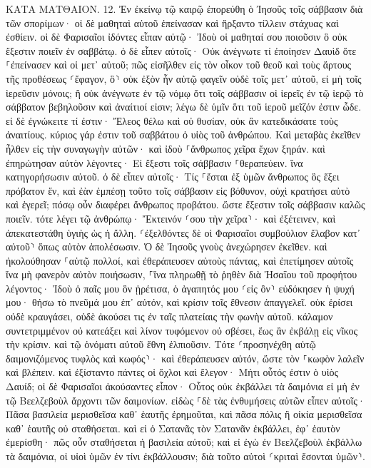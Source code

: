 \documentclass[twoside, 9pt]{extreport}
\begin{document}
ΚΑΤΑ ΜΑΤΘΑΙΟΝ.
12.
Ἐν ἐκείνῳ τῷ καιρῷ ἐπορεύθη ὁ Ἰησοῦς τοῖς σάββασιν διὰ τῶν σπορίμων· οἱ δὲ μαθηταὶ αὐτοῦ ἐπείνασαν καὶ ἤρξαντο τίλλειν στάχυας καὶ ἐσθίειν. 
οἱ δὲ Φαρισαῖοι ἰδόντες εἶπαν αὐτῷ· Ἰδοὺ οἱ μαθηταί σου ποιοῦσιν ὃ οὐκ ἔξεστιν ποιεῖν ἐν σαββάτῳ. 
ὁ δὲ εἶπεν αὐτοῖς· Οὐκ ἀνέγνωτε τί ἐποίησεν Δαυὶδ ὅτε ⸀ἐπείνασεν καὶ οἱ μετ᾽ αὐτοῦ; 
πῶς εἰσῆλθεν εἰς τὸν οἶκον τοῦ θεοῦ καὶ τοὺς ἄρτους τῆς προθέσεως ⸂ἔφαγον, ὃ⸃ οὐκ ἐξὸν ἦν αὐτῷ φαγεῖν οὐδὲ τοῖς μετ᾽ αὐτοῦ, εἰ μὴ τοῖς ἱερεῦσιν μόνοις; 
ἢ οὐκ ἀνέγνωτε ἐν τῷ νόμῳ ὅτι τοῖς σάββασιν οἱ ἱερεῖς ἐν τῷ ἱερῷ τὸ σάββατον βεβηλοῦσιν καὶ ἀναίτιοί εἰσιν; 
λέγω δὲ ὑμῖν ὅτι τοῦ ἱεροῦ μεῖζόν ἐστιν ὧδε. 
εἰ δὲ ἐγνώκειτε τί ἐστιν· Ἔλεος θέλω καὶ οὐ θυσίαν, οὐκ ἂν κατεδικάσατε τοὺς ἀναιτίους. 
κύριος γάρ ἐστιν τοῦ σαββάτου ὁ υἱὸς τοῦ ἀνθρώπου. 
Καὶ μεταβὰς ἐκεῖθεν ἦλθεν εἰς τὴν συναγωγὴν αὐτῶν· 
καὶ ἰδοὺ ⸀ἄνθρωπος χεῖρα ἔχων ξηράν. καὶ ἐπηρώτησαν αὐτὸν λέγοντες· Εἰ ἔξεστι τοῖς σάββασιν ⸀θεραπεύειν. ἵνα κατηγορήσωσιν αὐτοῦ. 
ὁ δὲ εἶπεν αὐτοῖς· Τίς ⸀ἔσται ἐξ ὑμῶν ἄνθρωπος ὃς ἕξει πρόβατον ἕν, καὶ ἐὰν ἐμπέσῃ τοῦτο τοῖς σάββασιν εἰς βόθυνον, οὐχὶ κρατήσει αὐτὸ καὶ ἐγερεῖ; 
πόσῳ οὖν διαφέρει ἄνθρωπος προβάτου. ὥστε ἔξεστιν τοῖς σάββασιν καλῶς ποιεῖν. 
τότε λέγει τῷ ἀνθρώπῳ· Ἔκτεινόν ⸂σου τὴν χεῖρα⸃· καὶ ἐξέτεινεν, καὶ ἀπεκατεστάθη ὑγιὴς ὡς ἡ ἄλλη. 
⸂ἐξελθόντες δὲ οἱ Φαρισαῖοι συμβούλιον ἔλαβον κατ᾽ αὐτοῦ⸃ ὅπως αὐτὸν ἀπολέσωσιν. 
Ὁ δὲ Ἰησοῦς γνοὺς ἀνεχώρησεν ἐκεῖθεν. καὶ ἠκολούθησαν ⸀αὐτῷ πολλοί, καὶ ἐθεράπευσεν αὐτοὺς πάντας, 
καὶ ἐπετίμησεν αὐτοῖς ἵνα μὴ φανερὸν αὐτὸν ποιήσωσιν, 
⸀ἵνα πληρωθῇ τὸ ῥηθὲν διὰ Ἠσαΐου τοῦ προφήτου λέγοντος· 
Ἰδοὺ ὁ παῖς μου ὃν ᾑρέτισα, ὁ ἀγαπητός μου ⸂εἰς ὃν⸃ εὐδόκησεν ἡ ψυχή μου· θήσω τὸ πνεῦμά μου ἐπ᾽ αὐτόν, καὶ κρίσιν τοῖς ἔθνεσιν ἀπαγγελεῖ. 
οὐκ ἐρίσει οὐδὲ κραυγάσει, οὐδὲ ἀκούσει τις ἐν ταῖς πλατείαις τὴν φωνὴν αὐτοῦ. 
κάλαμον συντετριμμένον οὐ κατεάξει καὶ λίνον τυφόμενον οὐ σβέσει, ἕως ἂν ἐκβάλῃ εἰς νῖκος τὴν κρίσιν. 
καὶ τῷ ὀνόματι αὐτοῦ ἔθνη ἐλπιοῦσιν. 
Τότε ⸂προσηνέχθη αὐτῷ δαιμονιζόμενος τυφλὸς καὶ κωφός⸃· καὶ ἐθεράπευσεν αὐτόν, ὥστε τὸν ⸀κωφὸν λαλεῖν καὶ βλέπειν. 
καὶ ἐξίσταντο πάντες οἱ ὄχλοι καὶ ἔλεγον· Μήτι οὗτός ἐστιν ὁ υἱὸς Δαυίδ; 
οἱ δὲ Φαρισαῖοι ἀκούσαντες εἶπον· Οὗτος οὐκ ἐκβάλλει τὰ δαιμόνια εἰ μὴ ἐν τῷ Βεελζεβοὺλ ἄρχοντι τῶν δαιμονίων. 
εἰδὼς ⸀δὲ τὰς ἐνθυμήσεις αὐτῶν εἶπεν αὐτοῖς· Πᾶσα βασιλεία μερισθεῖσα καθ᾽ ἑαυτῆς ἐρημοῦται, καὶ πᾶσα πόλις ἢ οἰκία μερισθεῖσα καθ᾽ ἑαυτῆς οὐ σταθήσεται. 
καὶ εἰ ὁ Σατανᾶς τὸν Σατανᾶν ἐκβάλλει, ἐφ᾽ ἑαυτὸν ἐμερίσθη· πῶς οὖν σταθήσεται ἡ βασιλεία αὐτοῦ; 
καὶ εἰ ἐγὼ ἐν Βεελζεβοὺλ ἐκβάλλω τὰ δαιμόνια, οἱ υἱοὶ ὑμῶν ἐν τίνι ἐκβάλλουσιν; διὰ τοῦτο αὐτοὶ ⸂κριταὶ ἔσονται ὑμῶν⸃. 
\end{document}
